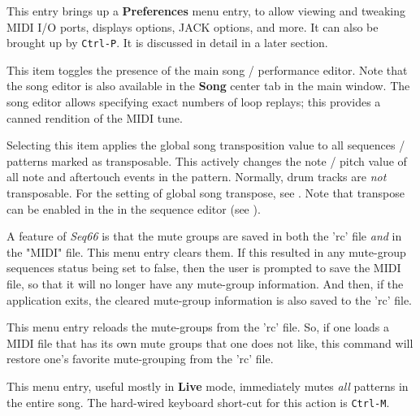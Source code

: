    \setcounter{ItemCounter}{0}      %

   This entry brings up a \textbf{Preferences} menu entry,
   to allow viewing and tweaking MIDI I/O ports, displays options, JACK
   options, and more.
   It can also be brought up by \texttt{Ctrl-P}.
   It is discussed in detail in a later section.

   This item toggles the presence of the main song / performance editor.
   Note that the song editor is also available in the
   \textbf{Song} center tab in the main window.
   The song editor allows specifying exact numbers of loop replays;
   this provides a canned rendition of the MIDI tune.

   Selecting this item applies the global song transposition value to
   all sequences / patterns marked as transposable.
   This actively changes the note / pitch value of all note and aftertouch
   events in the pattern.
   Normally, drum tracks are \textsl{not} transposable.
   For the setting of global song transpose, see
   .
   Note that transpose can be enabled in the
   in the sequence editor
   (see ).

   A feature of \textsl{Seq66} is that the mute groups
   are saved in both the 'rc' file \textsl{and} in the "MIDI" file.
   This menu entry clears them. If this resulted in any mute-group sequences
   status being set to false, then the user is prompted to save the MIDI
   file, so that it will no longer have any
   mute-group information.  And then, if the
   application exits, the cleared mute-group information is also saved to
   the 'rc' file.

   This menu entry reloads the mute-groups from the 'rc' file.
   So, if one loads a MIDI file that has its own mute groups that one does not
   like, this command will restore one's favorite mute-grouping from the 'rc'
   file.

   This menu entry, useful mostly in \textbf{Live} mode,
   immediately mutes \textsl{all} patterns in the entire song.
   The hard-wired keyboard short-cut for this action is \texttt{Ctrl-M}.

